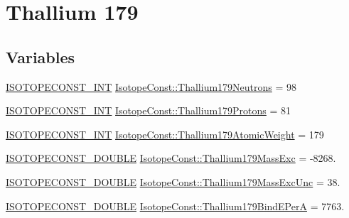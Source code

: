 \hypertarget{group___isotope_const-_thallium-_tl179}{}\section{Thallium 179}
\label{group___isotope_const-_thallium-_tl179}
\subsection*{Variables}
\begin{DoxyCompactItemize}
\item 
\mbox{\hyperlink{group___isotope_const-_macros_ga5f18360b3e99483a35c32d789e62621c}{I\+S\+O\+T\+O\+P\+E\+C\+O\+N\+S\+T\+\_\+\+I\+NT}} \mbox{\hyperlink{group___isotope_const-_thallium-_tl179_ga23b7e46328587b03431523715c2c56d5}{Isotope\+Const\+::\+Thallium179\+Neutrons}} = 98
\item 
\mbox{\hyperlink{group___isotope_const-_macros_ga5f18360b3e99483a35c32d789e62621c}{I\+S\+O\+T\+O\+P\+E\+C\+O\+N\+S\+T\+\_\+\+I\+NT}} \mbox{\hyperlink{group___isotope_const-_thallium-_tl179_gabea54a17ca2a154fb2816f927e9bf65f}{Isotope\+Const\+::\+Thallium179\+Protons}} = 81
\item 
\mbox{\hyperlink{group___isotope_const-_macros_ga5f18360b3e99483a35c32d789e62621c}{I\+S\+O\+T\+O\+P\+E\+C\+O\+N\+S\+T\+\_\+\+I\+NT}} \mbox{\hyperlink{group___isotope_const-_thallium-_tl179_ga719ad4c046359876ea81f574038f0734}{Isotope\+Const\+::\+Thallium179\+Atomic\+Weight}} = 179
\item 
\mbox{\hyperlink{group___isotope_const-_macros_ga8f45a7272ce02c0b4c65c44636ed719a}{I\+S\+O\+T\+O\+P\+E\+C\+O\+N\+S\+T\+\_\+\+D\+O\+U\+B\+LE}} \mbox{\hyperlink{group___isotope_const-_thallium-_tl179_gadc7b3519f4ce526ba3e7ae26bafd9688}{Isotope\+Const\+::\+Thallium179\+Mass\+Exc}} = -\/8268.
\item 
\mbox{\hyperlink{group___isotope_const-_macros_ga8f45a7272ce02c0b4c65c44636ed719a}{I\+S\+O\+T\+O\+P\+E\+C\+O\+N\+S\+T\+\_\+\+D\+O\+U\+B\+LE}} \mbox{\hyperlink{group___isotope_const-_thallium-_tl179_ga71c11f1983d6816bf35c535792132253}{Isotope\+Const\+::\+Thallium179\+Mass\+Exc\+Unc}} = 38.
\item 
\mbox{\hyperlink{group___isotope_const-_macros_ga8f45a7272ce02c0b4c65c44636ed719a}{I\+S\+O\+T\+O\+P\+E\+C\+O\+N\+S\+T\+\_\+\+D\+O\+U\+B\+LE}} \mbox{\hyperlink{group___isotope_const-_thallium-_tl179_ga4d9b4d51eeef92d3455c0348bd644aa1}{Isotope\+Const\+::\+Thallium179\+Bind\+E\+PerA}} = 7763.
\item 

\end{DoxyCompactItemize}
